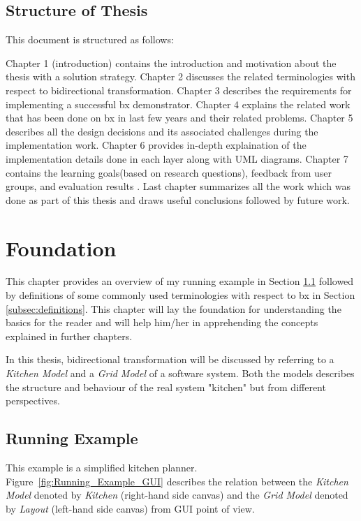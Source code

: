 \subsection{Structure of Thesis}\label{subsec:structure}
This document is structured as follows: 

Chapter 1 (introduction) contains the introduction and motivation about the thesis with a solution strategy. Chapter 2 discusses the related terminologies with respect to bidirectional transformation. Chapter 3 describes the requirements for implementing a successful bx demonstrator. Chapter 4 explains the related work that has been done on bx in last few years and their related problems. Chapter 5 describes all the design decisions and its associated challenges during the implementation work. Chapter 6 provides in-depth explaination of the implementation details done in each layer along with UML diagrams. Chapter 7 contains the learning goals(based on research questions), feedback from user groups, and evaluation results . Last chapter summarizes all the work which was done as part of this thesis and draws useful conclusions followed by future work.

\section{Foundation}\label{sec:foundation}
This chapter provides an overview of my running example in Section \ref{subsec:runningexample} followed by definitions of some commonly used terminologies with respect to bx in Section \ref{subsec:definitions}. This chapter will lay the foundation for understanding the basics for the reader and will help him/her in apprehending the concepts explained in further chapters.

In this thesis, bidirectional transformation will be discussed by referring to a \textit{Kitchen Model} and a \textit{Grid Model} of a software system. Both the models describes the structure and behaviour of the real system "kitchen" but from different perspectives.

\subsection{Running Example}\label{subsec:runningexample}
This example is a simplified kitchen planner. Figure~\ref{fig:Running_Example_GUI} describes the relation between the \textit{Kitchen Model} denoted by \textit{Kitchen} (right-hand side canvas) and the \textit{Grid Model} denoted by \textit{Layout} (left-hand side canvas) from GUI point of view. 

